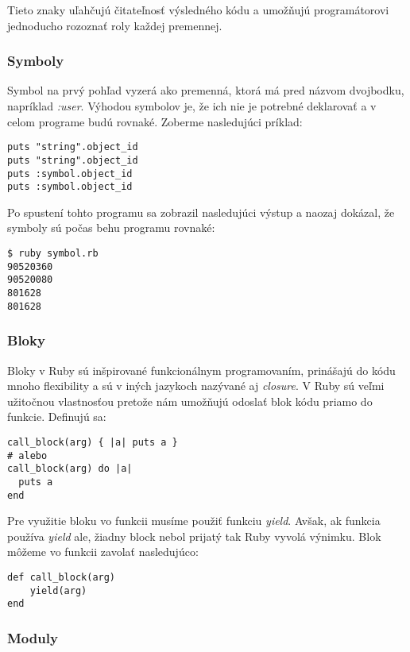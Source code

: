 Tieto znaky uľahčujú čitateľnosť výsledného kódu a umožňujú programátorovi jednoducho rozoznať roly každej premennej. \citep{web:rubylang}

\subsubsection{Symboly}

Symbol na prvý pohľad vyzerá ako premenná, ktorá má pred názvom dvojbodku, napríklad \emph{:user}. Výhodou symbolov je, že ich nie je potrebné deklarovať a v celom programe budú rovnaké. Zoberme nasledujúci príklad:

\begin{verbatim}
puts "string".object_id
puts "string".object_id
puts :symbol.object_id
puts :symbol.object_id
\end{verbatim}

Po spustení tohto programu sa zobrazil nasledujúci výstup a naozaj dokázal, že symboly sú počas behu programu rovnaké:

\begin{verbatim}
$ ruby symbol.rb
90520360
90520080
801628
801628
\end{verbatim}

\subsubsection{Bloky}

Bloky v Ruby sú inšpirované funkcionálnym programovaním, prinášajú do kódu mnoho flexibility a sú v iných jazykoch nazývané aj \emph{closure}. V Ruby sú veľmi užitočnou vlastnosťou pretože nám umožňujú odoslať blok kódu priamo do funkcie. Definujú sa:

\begin{verbatim}
call_block(arg) { |a| puts a }
# alebo
call_block(arg) do |a|
  puts a
end
\end{verbatim}

Pre využitie bloku vo funkcii musíme použiť funkciu \emph{yield}. Avšak, ak funkcia používa \emph{yield} ale, žiadny block nebol prijatý tak Ruby vyvolá výnimku. Blok môžeme vo funkcii zavolať nasledujúco:

\begin{verbatim}
def call_block(arg)
    yield(arg)
end
\end{verbatim}

\subsubsection{Moduly}

